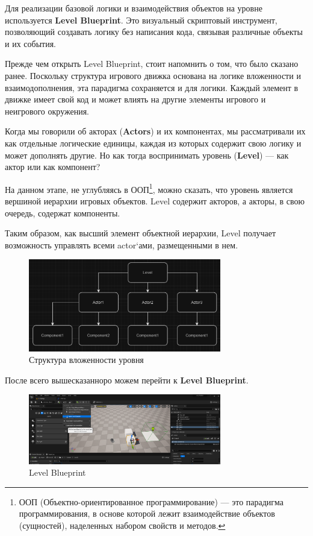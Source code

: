 Для реализации базовой логики и взаимодействия объектов на уровне используется \textbf{Level Blueprint}. Это визуальный скриптовый инструмент, позволяющий создавать логику без написания кода, связывая различные объекты и их события.

Прежде чем открыть Level Blueprint, стоит напомнить о том, что было сказано ранее. Поскольку структура игрового движка основана на логике вложенности и взаимодополнения, эта парадигма сохраняется и для логики. Каждый элемент в движке имеет свой код и может влиять на другие элементы игрового и неигрового окружения.

Когда мы говорили об акторах (\textbf{Actors}) и их компонентах, мы рассматривали их как отдельные логические единицы, каждая из которых содержит свою логику и может дополнять другие. Но как тогда воспринимать уровень (\textbf{Level}) — как актор или как компонент?

На данном этапе, не углубляясь в ООП\footnote{ООП (Объектно-ориентированное программирование) — это парадигма программирования, в основе которой лежит взаимодействие объектов (сущностей), наделенных набором свойств и методов.}, можно сказать, что уровень является вершиной иерархии игровых объектов. Level содержит акторов, а акторы, в свою очередь, содержат компоненты. 

Таким образом, как высший элемент объектной иерархии, Level получает возможность управлять всеми actor`ами, размещенными в нем.


\begin{figure}[h]
    \centering
    \includegraphics[width=0.75\textwidth]{Lections/BasicStructure.png}
    \caption{Структура вложенности уровня}
\end{figure}

После всего вышесказанноро можем перейти к \textbf{Level Blueprint}.

\begin{figure}[h]
    \centering
    \includegraphics[width=0.75\textwidth]{Lections/LevelBlueprint.png}
    \caption{Level Blueprint}
\end{figure}

